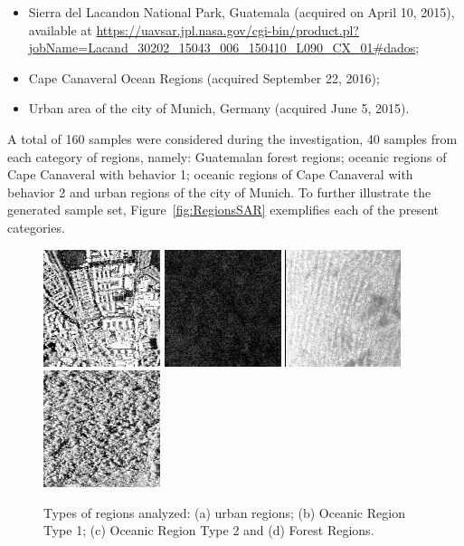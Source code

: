 \documentclass{isprs}
\begin{document}
	\begin{itemize}
		\item Sierra del Lacandon National Park, Guatemala (acquired on April 10, 2015), available at \url{https://uavsar.jpl.nasa.gov/cgi-bin/product.pl?jobName=Lacand_30202_15043_006_150410_L090_CX_01#dados};
		\item Cape Canaveral Ocean Regions (acquired September 22, 2016);
		\item Urban area of the city of Munich, Germany (acquired June 5, 2015).
	\end{itemize}
	
	A total of 160 samples were considered during the investigation, 40 samples from each category of regions, namely: Guatemalan forest regions; oceanic regions of Cape Canaveral with behavior 1; oceanic regions of Cape Canaveral with behavior 2 and urban regions of the city of Munich. To further illustrate the generated sample set, Figure~\ref{fig:RegionsSAR} exemplifies each of the present categories.
	
	\begin{figure}[hbt]
		\centering
		\includegraphics[width=.23\linewidth]{Figures/munichUrban.png}
		\includegraphics[width=.23\linewidth]{Figures/Cape1.png}
		\includegraphics[width=.23\linewidth]{Figures/Cape2.png}
		\includegraphics[width=.23\linewidth]{Figures/guatemalaflorest.png}
		\caption{Types of regions analyzed: (a) urban regions; (b) Oceanic Region Type 1; (c) Oceanic Region Type 2 and (d) Forest Regions.}\label{fig:RegioesSAR}
	\end{figure} 
	
\end{document}
